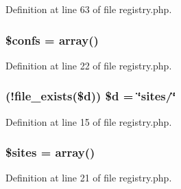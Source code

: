 \-Definition at line 63 of file registry.\-php.

\hypertarget{registry_8php_a95787ffe38852d43a64a75d95f5feb88}{
\subsubsection[{\$confs}]{\setlength{\rightskip}{0pt plus 5cm}\$confs = array()}}\label{registry_8php_a95787ffe38852d43a64a75d95f5feb88}


\-Definition at line 22 of file registry.\-php.

\hypertarget{registry_8php_a2bfbfe94d4b57f90c318fcad68f64732}{
\subsubsection[{\$d}]{ (!file\-\_\-exists(\$d)) \$d = \char`\"{}sites/\char`\"{}}}\label{registry_8php_a2bfbfe94d4b57f90c318fcad68f64732}


\-Definition at line 15 of file registry.\-php.

\hypertarget{registry_8php_a0692cce65f606b088875d5853da442f1}{
\subsubsection[{\$sites}]{\setlength{\rightskip}{0pt plus 5cm}\$sites = array()}}\label{registry_8php_a0692cce65f606b088875d5853da442f1}


\-Definition at line 21 of file registry.\-php.

